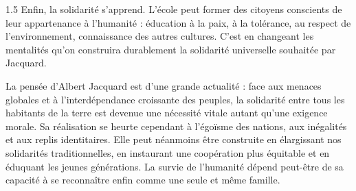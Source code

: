 \documentclass[12pt]{article}
\begin{document}
\begin{spacing}{1.5}
Enfin, la solidarité s'apprend. L'école peut former des citoyens conscients de leur appartenance à l'humanité : éducation à la paix, à la tolérance, au respect de l'environnement, connaissance des autres cultures. C'est en changeant les mentalités qu'on construira durablement la solidarité universelle souhaitée par Jacquard.


La pensée d'Albert Jacquard est d'une grande actualité : face aux menaces globales et à l'interdépendance croissante des peuples, la solidarité entre tous les habitants de la terre est devenue une nécessité vitale autant qu'une exigence morale. Sa réalisation se heurte cependant à l'égoïsme des nations, aux inégalités et aux replis identitaires. Elle peut néanmoins être construite en élargissant nos solidarités traditionnelles, en instaurant une coopération plus équitable et en éduquant les jeunes générations. La survie de l'humanité dépend peut-être de sa capacité à se reconnaître enfin comme une seule et même famille.

\end{spacing}
\end{document}
